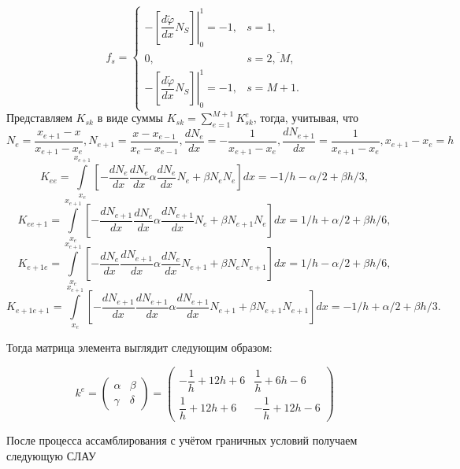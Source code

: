 \documentclass[14pt]{extreport}
\begin{document}
\begin{equation*}
f_s = 
\begin{cases}
	-\left.\left[\dfrac{d\widetilde{\varphi}}{dx}N_S\right]\right|_0^1=-1, & s=1,\\
	0, & s=\overline{2,\ M},\\
	-\left.\left[\dfrac{d\widetilde{\varphi}}{dx}N_S\right]\right|_0^1=-1, & s=M+1.
\end{cases}
\end{equation*}
Представляем $K_{sk}$ в виде суммы $K_{sk}=\sum\limits_{e=1}^{M+1}K_{sk}^e$, тогда, учитывая, что $N_e=\dfrac{x_{e+1}-x}{x_{e+1}-x_e}, N_{e+1}=\dfrac{x-x_{e-1}}{x_{e}-x_{e-1}}, \dfrac{dN_e}{dx}=-\dfrac{1}{x_{e+1}-x_e}, \dfrac{dN_{e+1}}{dx}=\dfrac{1}{x_{e+1}-x_e}, x_{e+1}-x_e=h$
$$K_{ee}=\int\limits_{x_e}^{x_{e+1}}\left[-\dfrac{dN_e}{dx}\dfrac{dN_e}{dx}\alpha\dfrac{dN_e}{dx}N_e+ \beta N_eN_e\right]dx=-1/h - \alpha/2 + \beta h/3,$$
$$K_{ee+1}=\int\limits_{x_e}^{x_{e+1}}\left[-\dfrac{dN_{e+1}}{dx}\dfrac{dN_e}{dx}\alpha\dfrac{dN_{e+1}}{dx}N_e+\beta N_{e+1}N_e\right]dx= 1/h + \alpha/2 + \beta h/6,$$
$$K_{e+1e}=\int\limits_{x_e}^{x_{e+1}}\left[-\dfrac{dN_e}{dx}\dfrac{dN_{e+1}}{dx}\alpha\dfrac{dN_e}{dx}N_{e+1}+\beta N_eN_{e+1}\right]dx= 1/h - \alpha/2 + \beta h/6,$$
$$K_{e+1e+1}=\int\limits_{x_e}^{x_{e+1}}\left[-\dfrac{dN_{e+1}}{dx}\dfrac{dN_{e+1}}{dx}\alpha\dfrac{dN_{e+1}}{dx}N_{e+1}+ \beta N_{e+1}N_{e+1}\right]dx= -1/h + \alpha/2 + \beta h/3.$$

Тогда матрица элемента выглядит следующим образом:

\begin{equation}
 k^e=\begin{pmatrix}\alpha & \beta\\
\gamma & \delta
\end{pmatrix}=\begin{pmatrix} -\dfrac{1}{h}+12h+6 & \dfrac{1}{h}+6h-6\\
 \dfrac{1}{h}+12h+6 & -\dfrac{1}{h}+12h-6
\end{pmatrix}
\end{equation}



После процесса ассамблирования с учётом граничных условий получаем следующую СЛАУ
\end{document}
